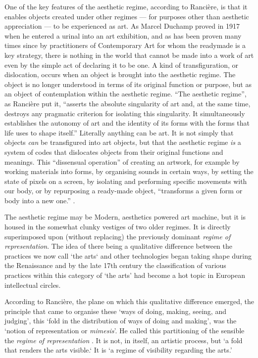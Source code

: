 \documentclass[letterpaper]{article}
\begin{document}
    One of the key features of the aesthetic regime, according to Rancière, is that it enables objects created under other regimes — for purposes other than aesthetic appreciation — to be experienced as art. As Marcel Duchamp proved in 1917 when he entered a urinal into an art exhibition, and as has been proven many times since by practitioners of Contemporary Art for whom the readymade is a key strategy, there is nothing in the world that cannot be made into a work of art even by the simple act of declaring it to be one. A kind of transfiguration, or dislocation, occurs when an object is brought into the aesthetic regime. The object is no longer understood in terms of its original function or purpose, but as an object of contemplation within the aesthetic regime. “The aesthetic regime”, as Rancière put it, “asserts the absolute singularity of art and, at the same time, destroys any pragmatic criterion for isolating this singularity. It simultaneously establishes the autonomy of art and the identity of its forms with the forms that life uses to shape itself.” Literally anything can be art. It is not simply that objects \emph{can} be transfigured into art objects, but that the aesthetic regime \emph{is} a system of codes that dislocates objects from their original functions and meanings. This “dissensual operation” of creating an artwork, for example by working materials into forms, by organising sounds in certain ways, by setting the state of pixels on a screen, by isolating and performing specific movements with our body, or by repurposing a ready-made object, “transforms a given form or body into a new one.” \citep[p.54]{RancierThEmncptdSpcttr2009}.

    The aesthetic regime may be Modern, aesthetics powered art machine, but it is housed in the somewhat clunky vestiges of two older regimes. It is directly superimposed upon (without replacing) the previously dominant \emph{regime of representation}. The idea of there being a qualitative difference between the practices we now call ‘the arts‘ and other technologies began taking shape during the Renaissance \citep[p.136]{TatarkiewiczWhtIsArt1971} and by the late 17th century the classification of various practices within this category of ‘the arts’ had become a hot topic in European intellectual circles.

    According to Rancière, the plane on which this qualitative difference emerged, the principle that came to organise these ‘ways of doing, making, seeing, and judging’, this ‘fold in the distribution of ways of doing and making’, was the ‘notion of representation or \emph{mimesis}’. He called this partitioning of the sensible the \emph{regime of representation} \citep[p.22]{RancierPltcsOfThAsthtcs2004}. It is not, in itself, an artistic process, but ‘a fold that renders the arts visible.‘ It is  ‘a regime of visibility regarding the arts.’
    
\end{document}
